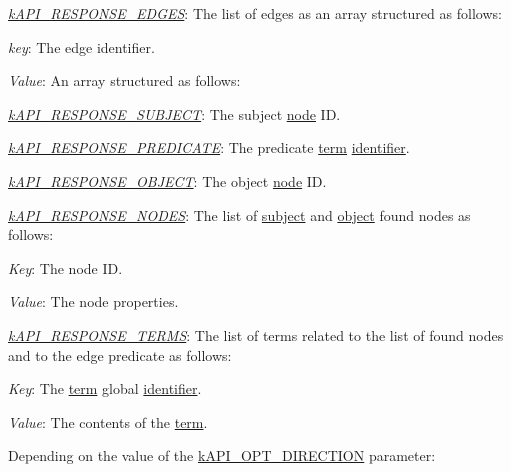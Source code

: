 \begin{DoxyItemize}
\item {\itshape \hyperlink{}{k\-A\-P\-I\-\_\-\-R\-E\-S\-P\-O\-N\-S\-E\-\_\-\-E\-D\-G\-E\-S}}\-: The list of edges as an array structured as follows\-: 
\begin{DoxyItemize}
\item {\itshape key}\-: The edge identifier. 
\item {\itshape Value}\-: An array structured as follows\-: 
\begin{DoxyItemize}
\item {\itshape \hyperlink{}{k\-A\-P\-I\-\_\-\-R\-E\-S\-P\-O\-N\-S\-E\-\_\-\-S\-U\-B\-J\-E\-C\-T}}\-: The subject \hyperlink{class_c_ontology_node}{node} I\-D. 
\item {\itshape \hyperlink{}{k\-A\-P\-I\-\_\-\-R\-E\-S\-P\-O\-N\-S\-E\-\_\-\-P\-R\-E\-D\-I\-C\-A\-T\-E}}\-: The predicate \hyperlink{class_c_ontology_term}{term} \hyperlink{}{identifier}. 
\item {\itshape \hyperlink{}{k\-A\-P\-I\-\_\-\-R\-E\-S\-P\-O\-N\-S\-E\-\_\-\-O\-B\-J\-E\-C\-T}}\-: The object \hyperlink{class_c_ontology_node}{node} I\-D. 
\end{DoxyItemize}
\end{DoxyItemize}
\item {\itshape \hyperlink{}{k\-A\-P\-I\-\_\-\-R\-E\-S\-P\-O\-N\-S\-E\-\_\-\-N\-O\-D\-E\-S}}\-: The list of \hyperlink{}{subject} and \hyperlink{}{object} found nodes as follows\-: 
\begin{DoxyItemize}
\item {\itshape Key}\-: The node I\-D. 
\item {\itshape Value}\-: The node properties. 
\end{DoxyItemize}
\item {\itshape \hyperlink{}{k\-A\-P\-I\-\_\-\-R\-E\-S\-P\-O\-N\-S\-E\-\_\-\-T\-E\-R\-M\-S}}\-: The list of terms related to the list of found nodes and to the edge predicate as follows\-: 
\begin{DoxyItemize}
\item {\itshape Key}\-: The \hyperlink{class_c_ontology_term}{term} global \hyperlink{}{identifier}. 
\item {\itshape Value}\-: The contents of the \hyperlink{class_c_ontology_term}{term}. 
\end{DoxyItemize}
\end{DoxyItemize}

Depending on the value of the \hyperlink{}{k\-A\-P\-I\-\_\-\-O\-P\-T\-\_\-\-D\-I\-R\-E\-C\-T\-I\-O\-N} parameter\-:


